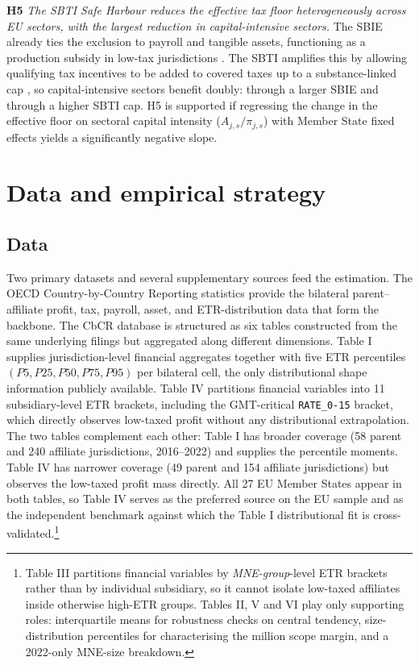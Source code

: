 \documentclass[11pt,a4paper]{article}
\newcommand{\EUR}{\texteuro}
\newcommand{\code}[1]{\texttt{#1}}
\begin{document}
\textbf{H5} \emph{The SBTI Safe Harbour reduces the effective tax floor heterogeneously across EU sectors, with the largest reduction in capital-intensive sectors.} The SBIE already ties the exclusion to payroll and tangible assets, functioning as a production subsidy in low-tax jurisdictions \citep{schjelderup2024}. The SBTI amplifies this by allowing qualifying tax incentives to be added to covered taxes up to a substance-linked cap \citep{oecd2026}, so capital-intensive sectors benefit doubly: through a larger SBIE and through a higher SBTI cap. H5 is supported if regressing the change in the effective floor on sectoral capital intensity ($A_{j,s}/\pi_{j,s}$) with Member State fixed effects yields a significantly negative slope.

\section{Data and empirical strategy}\label{sec:methodology}

\subsection{Data}\label{sec:data}

Two primary datasets and several supplementary sources feed the estimation. The OECD Country-by-Country Reporting statistics \citep{oecd2025a} provide the bilateral parent--affiliate profit, tax, payroll, asset, and ETR-distribution data that form the backbone. The CbCR database is structured as six tables constructed from the same underlying filings but aggregated along different dimensions. Table I supplies jurisdiction-level financial aggregates together with five ETR percentiles $(P5, P25, P50, P75, P95)$ per bilateral cell, the only distributional shape information publicly available. Table IV partitions financial variables into 11 subsidiary-level ETR brackets, including the GMT-critical \code{RATE\_0-15} bracket, which directly observes low-taxed profit without any distributional extrapolation. The two tables complement each other: Table I has broader coverage (58 parent and 240 affiliate jurisdictions, 2016--2022) and supplies the percentile moments. Table IV has narrower coverage (49 parent and 154 affiliate jurisdictions) but observes the low-taxed profit mass directly. All 27 EU Member States appear in both tables, so Table IV serves as the preferred source on the EU sample and as the independent benchmark against which the Table I distributional fit is cross-validated.\footnote{Table III partitions financial variables by \emph{MNE-group}-level ETR brackets rather than by individual subsidiary, so it cannot isolate low-taxed affiliates inside otherwise high-ETR groups. Tables II, V and VI play only supporting roles: interquartile means for robustness checks on central tendency, size-distribution percentiles for characterising the \EUR750 million scope margin, and a 2022-only MNE-size breakdown.}
\end{document}
